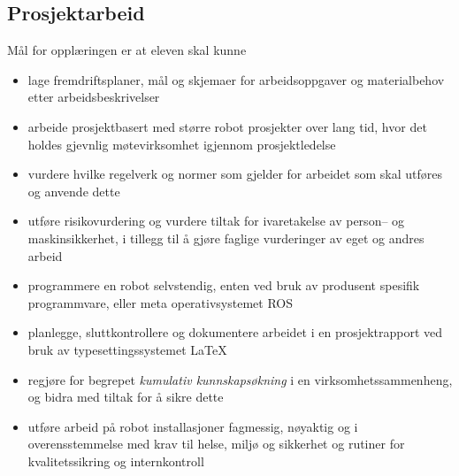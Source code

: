 \newpage

\subsection*{Prosjektarbeid}

    Mål for opplæringen er at eleven skal kunne

    \begin{itemize}
        \item lage fremdriftsplaner, mål og skjemaer for arbeidsoppgaver og materialbehov etter arbeidsbeskrivelser
        \item arbeide prosjektbasert med større robot prosjekter over lang tid, hvor det holdes gjevnlig møtevirksomhet igjennom prosjektledelse
        \item vurdere hvilke regelverk og normer som gjelder for arbeidet som skal utføres og anvende dette
        \item utføre risikovurdering og vurdere tiltak for ivaretakelse av person– og maskinsikkerhet, i tillegg til å gjøre faglige vurderinger av eget og andres arbeid
        \item programmere en robot selvstendig, enten ved bruk av produsent spesifik programmvare, eller meta operativsystemet ROS
        \item planlegge, sluttkontrollere og dokumentere arbeidet i en prosjektrapport ved bruk av typesettingssystemet LaTeX
        \item regjøre for begrepet \emph{kumulativ kunnskapsøkning} i en virksomhetssammenheng, og bidra med tiltak for å sikre dette
        \item utføre arbeid på robot installasjoner fagmessig, nøyaktig og i overensstemmelse med krav til helse, miljø og sikkerhet og rutiner for kvalitetssikring og internkontroll
    \end{itemize}
